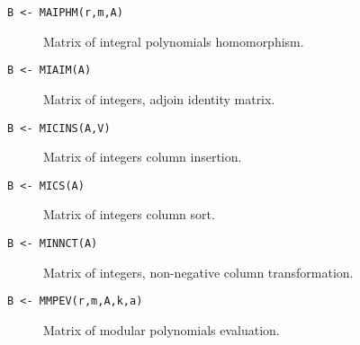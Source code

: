\begin{description}
\begin{description}

\item[{\tt B <- MAIPHM(r,m,A) 
}] Matrix of integral polynomials homomorphism.

\item[{\tt B <- MIAIM(A) 
}] Matrix of integers, adjoin identity matrix.

\item[{\tt B <- MICINS(A,V) 
}] Matrix of integers column insertion.

\item[{\tt B <- MICS(A) 
}] Matrix of integers column sort.

\item[{\tt B <- MINNCT(A) 
}] Matrix of integers, non-negative column transformation.

\item[{\tt B <- MMPEV(r,m,A,k,a) 
}] Matrix of modular polynomials evaluation.

\end{description} %

\end{description}  %
